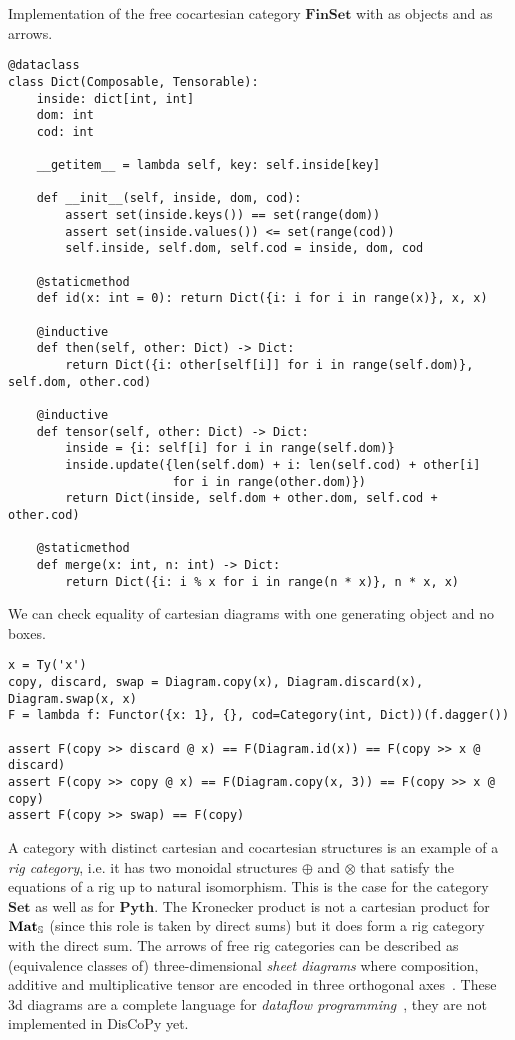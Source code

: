 \begin{python}
Implementation of the free cocartesian category $\mathbf{FinSet}$ with  as objects and  as arrows.

\begin{verbatim}
@dataclass
class Dict(Composable, Tensorable):
    inside: dict[int, int]
    dom: int
    cod: int

    __getitem__ = lambda self, key: self.inside[key]

    def __init__(self, inside, dom, cod):
        assert set(inside.keys()) == set(range(dom))
        assert set(inside.values()) <= set(range(cod))
        self.inside, self.dom, self.cod = inside, dom, cod

    @staticmethod
    def id(x: int = 0): return Dict({i: i for i in range(x)}, x, x)

    @inductive
    def then(self, other: Dict) -> Dict:
        return Dict({i: other[self[i]] for i in range(self.dom)}, self.dom, other.cod)

    @inductive
    def tensor(self, other: Dict) -> Dict:
        inside = {i: self[i] for i in range(self.dom)}
        inside.update({len(self.dom) + i: len(self.cod) + other[i]
                       for i in range(other.dom)})
        return Dict(inside, self.dom + other.dom, self.cod + other.cod)

    @staticmethod
    def merge(x: int, n: int) -> Dict:
        return Dict({i: i % x for i in range(n * x)}, n * x, x)
\end{verbatim}
\end{python}

\begin{example}
We can check equality of cartesian diagrams with one generating object and no boxes.

\begin{verbatim}
x = Ty('x')
copy, discard, swap = Diagram.copy(x), Diagram.discard(x), Diagram.swap(x, x)
F = lambda f: Functor({x: 1}, {}, cod=Category(int, Dict))(f.dagger())

assert F(copy >> discard @ x) == F(Diagram.id(x)) == F(copy >> x @ discard)
assert F(copy >> copy @ x) == F(Diagram.copy(x, 3)) == F(copy >> x @ copy)
assert F(copy >> swap) == F(copy)
\end{verbatim}
\end{example}

A category with distinct cartesian and cocartesian structures is an example of a \emph{rig category}, i.e. it has two monoidal structures $\oplus$ and $\otimes$ that satisfy the equations of a rig up to natural isomorphism.
This is the case for the category $\mathbf{Set}$ as well as for $\mathbf{Pyth}$.
The Kronecker product is not a cartesian product for $\mathbf{Mat}_\S$ (since this role is taken by direct sums) but it does form a rig category with the direct sum.
The arrows of free rig categories can be described as (equivalence classes of) three-dimensional \emph{sheet diagrams} where composition, additive and multiplicative tensor are encoded in three orthogonal axes~\cite{ComfortEtAl20}.
These 3d diagrams are a complete language for \emph{dataflow programming}~\cite{Delpeuch20a}, they are not implemented in DisCoPy yet.

